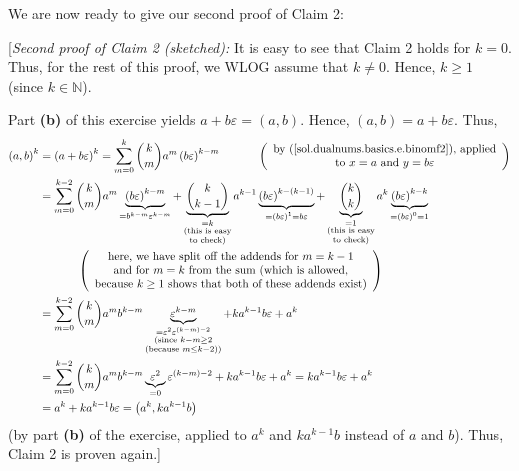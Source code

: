 \documentclass[paper=a4, fontsize=12pt]{scrartcl}%
\let\sumnonlimits\sum
\renewcommand{\sum}{\sumnonlimits\limits}
\theoremstyle{plainsl}
\theoremstyle{definition}
\theoremstyle{remark}
\begin{document}
We are now ready to give our second proof of Claim 2:

[\textit{Second proof of Claim 2 (sketched):} It is easy to see that Claim 2
holds for $k=0$. Thus, for the rest of this proof, we WLOG assume that
$k\neq0$. Hence, $k\geq1$ (since $k\in\mathbb{N}$).

Part \textbf{(b)} of this exercise yields $a+b\varepsilon=\left(  a,b\right)
$. Hence, $\left(  a,b\right)  =a+b\varepsilon$. Thus,%
\begin{align*}
\left(  a,b\right)  ^{k}  &  =\left(  a+b\varepsilon\right)  ^{k}=\sum
_{m=0}^{k}\dbinom{k}{m}a^{m}\left(  b\varepsilon\right)  ^{k-m}%
\ \ \ \ \ \ \ \ \ \ \left(
\begin{array}
[c]{c}%
\text{by (\ref{sol.dualnums.basics.e.binomf2}), applied}\\
\text{to }x=a\text{ and }y=b\varepsilon
\end{array}
\right) \\
&  =\sum_{m=0}^{k-2}\dbinom{k}{m}a^{m}\underbrace{\left(  b\varepsilon\right)
^{k-m}}_{=b^{k-m}\varepsilon^{k-m}}+\underbrace{\dbinom{k}{k-1}}%
_{\substack{=k\\\text{(this is easy}\\\text{to check)}}}a^{k-1}%
\underbrace{\left(  b\varepsilon\right)  ^{k-\left(  k-1\right)  }}_{=\left(
b\varepsilon\right)  ^{1}=b\varepsilon}+\underbrace{\dbinom{k}{k}%
}_{\substack{=1\\\text{(this is easy}\\\text{to check)}}}a^{k}%
\underbrace{\left(  b\varepsilon\right)  ^{k-k}}_{=\left(  b\varepsilon
\right)  ^{0}=1}\\
&  \ \ \ \ \ \ \ \ \ \ \left(
\begin{array}
[c]{c}%
\text{here, we have split off the addends for }m=k-1\\
\text{and for }m=k\text{ from the sum (which is allowed,}\\
\text{because }k\geq1\text{ shows that both of these addends exist)}%
\end{array}
\right) \\
&  =\sum_{m=0}^{k-2}\dbinom{k}{m}a^{m}b^{k-m}\underbrace{\varepsilon^{k-m}%
}_{\substack{=\varepsilon^{2}\varepsilon^{\left(  k-m\right)  -2}%
\\\text{(since }k-m\geq2\\\text{(because }m\leq k-2\text{))}}}+ka^{k-1}%
b\varepsilon+a^{k}\\
&  =\sum_{m=0}^{k-2}\dbinom{k}{m}a^{m}b^{k-m}\underbrace{\varepsilon^{2}}%
_{=0}\varepsilon^{\left(  k-m\right)  -2}+ka^{k-1}b\varepsilon+a^{k}%
=ka^{k-1}b\varepsilon+a^{k}\\
&  =a^{k}+ka^{k-1}b\varepsilon=\left(  a^{k},ka^{k-1}b\right)
\end{align*}
(by part \textbf{(b)} of the exercise, applied to $a^{k}$ and $ka^{k-1}b$
instead of $a$ and $b$). Thus, Claim 2 is proven again.]
\end{document}
